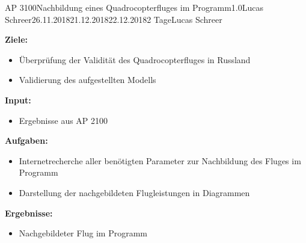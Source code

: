 \begin{appendix}
\clearpage
\begin{wpd}{AP 3100}{Nachbildung eines Quadrocopterfluges im Programm}{1.0}{Lucas Schreer}{26.11.2018}{21.12.2018}{22.12.2018}{2 Tage}{Lucas Schreer}
    {
    \textbf{Ziele:}
    \begin{itemize}
        \item Überprüfung der Validität des Quadrocopterfluges in Russland
        \item Validierung des aufgestellten Modells
    \end{itemize}
    \textbf{Input:}
    \begin{itemize}
        \item Ergebnisse aus AP 2100
    \end{itemize}
    \textbf{Aufgaben:}
    \begin{itemize}
        \item Internetrecherche aller benötigten Parameter zur Nachbildung des Fluges im Programm
        \item Darstellung der nachgebildeten Flugleistungen in Diagrammen
    \end{itemize}
    \textbf{Ergebnisse:}
    \begin{itemize}
        \item Nachgebildeter Flug im Programm
    \end{itemize}
    }
\end{wpd}



\end{appendix}
